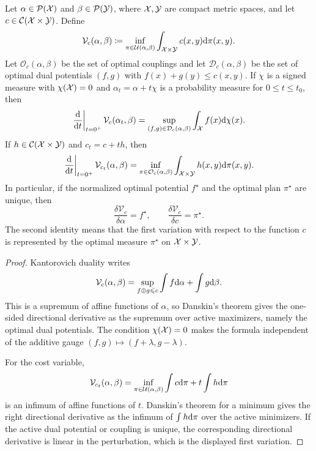 \begin{prop}\label{prop-ot-first-variations-unregularized}
	Let $\alpha\in\mathcal{P}(\mathcal{X})$ and $\beta\in\mathcal{P}(\mathcal{Y})$, where $\mathcal{X},\mathcal{Y}$ are compact metric spaces, and let $c\in\mathcal{C}(\mathcal{X}\times\mathcal{Y})$. Define
	\[
		\mathcal V_c(\alpha,\beta)
		\coloneqq
		\inf_{\pi\in\mathcal{U}(\alpha,\beta)}
		\int_{\mathcal{X}\times\mathcal{Y}}c(x,y)\mathrm{d}\pi(x,y).
	\]
	Let $\mathcal O_c(\alpha,\beta)$ be the set of optimal couplings and let $\mathcal D_c(\alpha,\beta)$ be the set of optimal dual potentials $(f,g)$ with $f(x)+g(y)\leq c(x,y)$. If $\chi$ is a signed measure with $\chi(\mathcal{X})=0$ and $\alpha_t=\alpha+t\chi$ is a probability measure for $0\leq t\leq t_0$, then
	\[
		\left.\frac{\mathrm{d}}{\mathrm{d} t}\right|_{t=0^+}
		\mathcal V_c(\alpha_t,\beta)
		=
		\sup_{(f,g)\in\mathcal D_c(\alpha,\beta)}
		\int_{\mathcal{X}} f(x)\mathrm{d}\chi(x).
	\]
	If $h\in\mathcal{C}(\mathcal{X}\times\mathcal{Y})$ and $c_t=c+th$, then
	\[
		\left.\frac{\mathrm{d}}{\mathrm{d} t}\right|_{t=0^+}
		\mathcal V_{c_t}(\alpha,\beta)
		=
		\inf_{\pi\in\mathcal O_c(\alpha,\beta)}
		\int_{\mathcal{X}\times\mathcal{Y}} h(x,y)\mathrm{d}\pi(x,y).
	\]
	In particular, if the normalized optimal potential $f^\star$ and the optimal plan $\pi^\star$ are unique, then
	\[
		\frac{\delta \mathcal V_c}{\delta\alpha}=f^\star,
		\qquad
		\frac{\delta \mathcal V_c}{\delta c}=\pi^\star .
	\]
	The second identity means that the first variation with respect to the function $c$ is represented by the optimal measure $\pi^\star$ on $\mathcal{X}\times\mathcal{Y}$.
\end{prop}
\begin{proof}
	Kantorovich duality writes
	\[
		\mathcal V_c(\alpha,\beta)
		=
		\sup_{f\oplus g\leqslant c}
		\int f\mathrm{d}\alpha+\int g\mathrm{d}\beta .
	\]
	This is a supremum of affine functions of $\alpha$, so Danskin's theorem gives the one-sided directional derivative as the supremum over active maximizers, namely the optimal dual potentials. The condition $\chi(\mathcal{X})=0$ makes the formula independent of the additive gauge $(f,g)\mapsto(f+\lambda,g-\lambda)$.

	For the cost variable,
	\[
		\mathcal V_{c_t}(\alpha,\beta)
		=
		\inf_{\pi\in\mathcal{U}(\alpha,\beta)}
		\int c\mathrm{d}\pi+t\int h\mathrm{d}\pi
	\]
	is an infimum of affine functions of $t$. Danskin's theorem for a minimum gives the right directional derivative as the infimum of $\int h\mathrm{d}\pi$ over the active minimizers. If the active dual potential or coupling is unique, the corresponding directional derivative is linear in the perturbation, which is the displayed first variation.
\end{proof}

